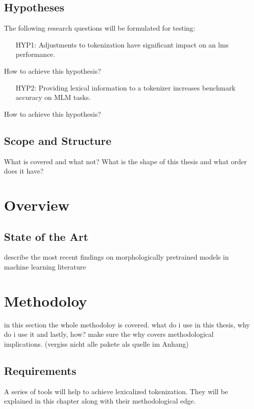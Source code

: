 \documentclass[english]{ttlab-qualify}
\begin{document}
    \section{Hypotheses}
    The following research questions will be formulated for testing:
    \begin{framed}
        \begin{itemize}[itemindent=1em]
            \item[HYP1:] Adjustments to tokenization have significant impact on an \ac{lm}s performance.
        \end{itemize}
    \end{framed}
    How to achieve this hypothesis?
    \begin{framed}
        \begin{itemize}[itemindent=1em]
        \item[HYP2:] Providing lexical information to a tokenizer increases benchmark accuracy on MLM tasks.
    \end{itemize}
    \end{framed}
    How to achieve this hypothesis?

    \section{Scope and Structure}
    What is covered and what not?
    What is the shape of this thesis and what order does it have?

    \chapter{Overview}
    \section{State of the Art}
    describe the most recent findings on morphologically pretrained models in machine learning literature

    \chapter{Methodoloy}
    in this section the whole methodoloy is covered. what do i use in this thesis, why do i use it and lastly, how?
    make sure the why covers methodological implications. (vergiss nicht alle pakete als quelle im Anhang)

    \section{Requirements}
    A series of tools will help to achieve lexicalized tokenization.
    They will be explained in this chapter along with their methodological edge.
\end{document}
